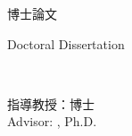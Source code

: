 \begin{titlepage}
  \vspace{1cm}
  \begin{CJK}{UTF8}{bkai}
    \begin{center}
      \fontsize{18}{27}\selectfont
      \makeatletter
      \school@zh\college@zh\institute@zh\par
      \makeatother
      博士論文\par
      {\fontsize{14}{21}\selectfont
        \makeatletter
        \institute@en\par
        \college@en\par
        \makeatother
      }
      {\fontsize{16}{24}\selectfont
        \makeatletter
        \school@en\par
        \makeatother
        Doctoral Dissertation\par
      }
      \vspace{\fill}
      \makeatletter
      \title@zh\par
      \title@en\par
      \vspace{\fill}
      \student@zh\\
      \student@en\par
      \vspace{2cm}
      指導教授：\advisor@zh 博士\\
      Advisor: \advisor@en, Ph.D.\par
      \vspace{1.5cm}
      \time@zh\\
      \time@en
      \makeatother
    \end{center}
  \end{CJK}
  \vspace{1cm}
\end{titlepage}